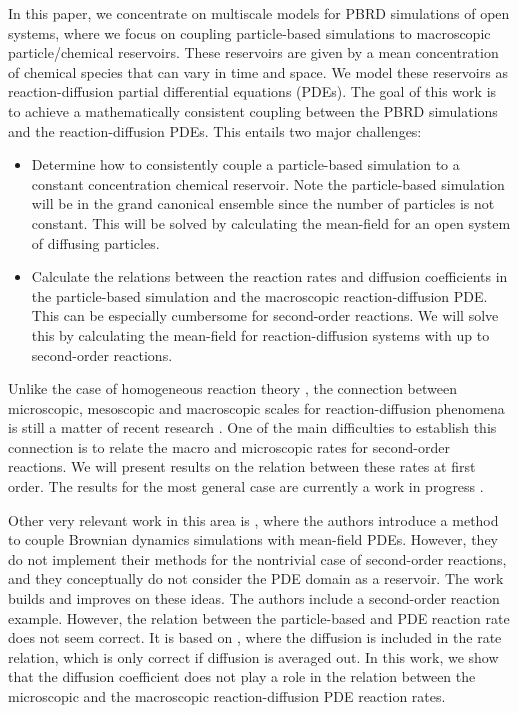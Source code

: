 \documentclass[10pt,twocolumn]{revtex4-1}
\begin{document}
	In this paper, we concentrate on multiscale models for PBRD simulations of open systems, where we focus on coupling particle-based simulations to macroscopic particle/chemical reservoirs. These reservoirs are given by a mean concentration of chemical species that can vary in time and space. We model these reservoirs as reaction-diffusion partial differential equations (PDEs). The goal of this work is to achieve a mathematically consistent coupling between the PBRD simulations and the reaction-diffusion PDEs. This entails two major challenges:
	\begin{itemize}
		\item Determine how to consistently couple a particle-based simulation to a constant concentration chemical reservoir. Note the particle-based simulation will be in the grand canonical ensemble since the number of particles is not constant. This will be solved by calculating the mean-field for an open system of diffusing particles.
		\item Calculate the relations between the reaction rates and diffusion coefficients in the particle-based simulation and the macroscopic reaction-diffusion PDE. This can be especially cumbersome for second-order reactions. We will solve this by calculating the mean-field for reaction-diffusion systems with up to second-order reactions.
	\end{itemize}  
	
	Unlike the case of homogeneous reaction theory \cite{anderson2015stochastic, kurtz1972relationship, qian2011nonlinear}, the connection between microscopic, mesoscopic and macroscopic scales for reaction-diffusion phenomena is still a matter of recent research \cite{arnold1980consistency, feng1996hydrodynamic, hellander2014reaction, isaacson2008relationship, isaacson2013convergent}. One of the main difficulties to establish this connection is to relate the macro and microscopic rates for second-order reactions. We will present  results on the relation between these rates at first order. The results for the most general case are currently a work in progress \cite{kostreHydrolimit}. 
	
	Other very relevant work in this area is \cite{franz2013multiscale}, where the authors introduce a method to couple Brownian dynamics simulations with mean-field PDEs. However, they do not implement their methods for the nontrivial case of second-order reactions, and they conceptually do not consider the PDE domain as a reservoir. The work \cite{smith2018auxiliary} builds and improves on these ideas. The authors include a second-order reaction example. However, the relation between the particle-based and PDE reaction rate does not seem correct. It is based on \cite{erban2009stochastic}, where the diffusion is included in the rate relation, which is only correct if diffusion is averaged out. In this work, we show that the diffusion coefficient does not play a role in the relation between the microscopic and the macroscopic reaction-diffusion PDE reaction rates.
	
\end{document}
